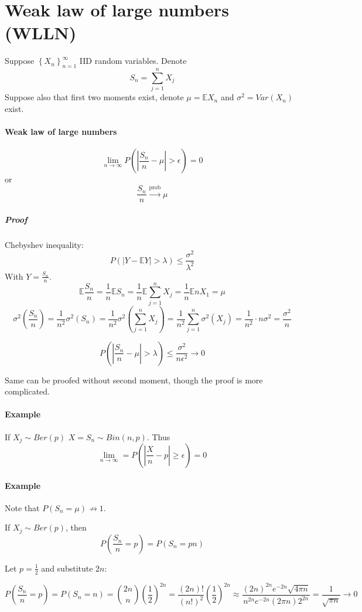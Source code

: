 \section{Weak law of large numbers (WLLN)}
Suppose $\left\{ X_n \right\}_{n=1}^\infty$ IID random variables. Denote
$$S_n = \sum_{j=1}^n X_j$$
Suppose also that first two moments exist, denote  $\mu=\mathbb{E}X_n$ and $\sigma^2 = Var(X_n)$ exist.
\paragraph{Weak law of large numbers}
$$\lim_{n \to \infty} P \left( \left| \frac{S_n}{n} - \mu \right| > \epsilon \right) = 0$$
or
$$\frac{S_n}{n} \stackrel{\text{prob}}{\to} \mu$$
\subparagraph{Proof}
Chebyshev inequality:
$$P \left( \left| Y  -\mathbb{E} Y\right| > \lambda \right) \leq \frac{\sigma^2}{\lambda^2}$$
With $Y = \frac{S_n}{n}$.
$$\mathbb{E} \frac{S_n}{n} = \frac{1}{n} \mathbb{E} S_n = \frac{1}{n}  \mathbb{E}  \sum_{j=1}^n X_j = \frac{1}{n}  \mathbb{E} nX_1 = \mu  $$
$$\sigma^2 \left( \frac{S_n}{n} \right) = \frac{1}{n^2} \sigma^2(S_n)  = \frac{1}{n^2} \sigma^2\left(   \sum_{j=1}^n X_j  \right)  = \frac{1}{n^2}\sum_{j=1}^n \sigma^2\left(    X_j  \right)  = \frac{1}{n^2}\cdot n \sigma^2 = \frac{\sigma^2}{n}   $$

$$P \left( \left| \frac{S_n}{n} - \mu \right| > \lambda \right) \leq \frac{\sigma^2}{n \epsilon^2} \to 0$$

Same can be proofed without second moment, though the proof is more complicated.

\paragraph{Example}
If $X_j \sim Ber(p)$
$X = S_n \sim Bin(n,p)$. Thus
$$\lim_{n\to \infty} = P \left(  \left| \frac{X}{n} - p \right| \geq \epsilon\right) = 0$$
\paragraph{Example}
Note that $P(S_n = \mu) \not \to 1$.

If $X_j \sim Ber(p)$, then
$$P\left(\frac{S_n}{n} = p \right) = P\left(S_n = pn \right)$$

Let $p = \frac{1}{2}$ and substitute $2n$:

$$P\left(\frac{S_n}{n} = p \right) = P\left(S_n = n \right) = \binom{2n}{n} \left(\frac{1}{2}\right)^{2n} = \frac{(2n)!}{(n!)^2}\left(\frac{1}{2}\right)^{2n}  \approx \frac{(2n)^{2n} e^{-2n} \sqrt{4\pi n} }{n^{2n} e^{-2n} (2\pi n)  2^{2n }} = \frac{1}{\sqrt{\pi n}} \to 0 $$
